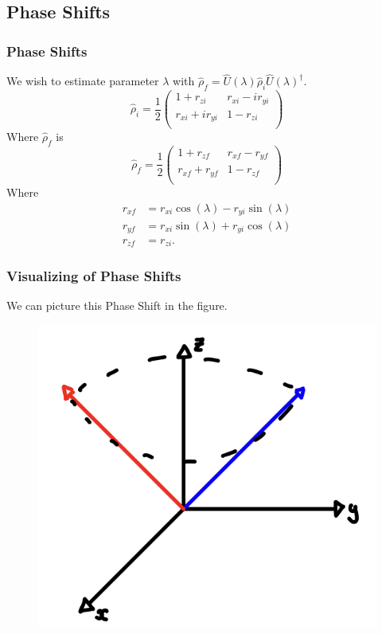 \documentclass{beamer}
\begin{document}
\subsection{\tiny{Phase Shifts}}
\begin{frame}
\frametitle{Phase Shifts}
We wish to estimate parameter $\lambda$ with $\hat{\rho}_f=\hat{U}(\lambda)\hat{\rho}_i\hat{U}(\lambda)^{\dagger}$.
\begin{equation}\label{eq:29}
\hat{\rho}_i=\frac{1}{2}
\begin{pmatrix}
1+r_{zi} & r_{xi}-ir_{yi} \\
r_{xi}+ir_{yi} & 1-r_{zi} \\
\end{pmatrix}
\end{equation}
Where $\hat{\rho}_f$ is
\begin{equation}\label{eq:30}
\hat{\rho}_f = \frac{1}{2}
\begin{pmatrix}
1+r_{zf} & r_{xf}-r_{yf} \\
r_{xf}+r_{yf} & 1-r_{zf}  \\
\end{pmatrix}
\end{equation}
Where
\begin{align}\label{eq:31}
r_{xf}&=r_{xi}\cos({\lambda})-r_{yi}\sin({\lambda}) \nonumber \\
r_{yf}&=r_{xi}\sin({\lambda})+r_{yi}\cos({\lambda}) \\
r_{zf}&=r_{zi}. \nonumber 
\end{align}
\end{frame}
\begin{frame}
\frametitle{Visualizing of Phase Shifts}
We can picture this Phase Shift in the figure.
\begin{figure}
\begin{center}
\includegraphics[width=0.75\linewidth]{Phase-Shift-Modeling.jpeg}
\end{center}
\end{figure}
\end{frame}
\end{document}
